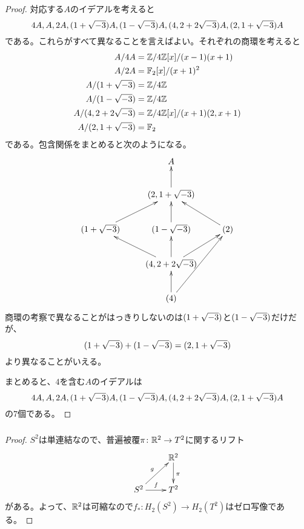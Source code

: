 \begin{proof}
対応する$A$のイデアルを考えると
\[
4A , A , 2A , (1+\sqrt{-3}) A , (1 - \sqrt{-3})A , (4, 2 + 2\sqrt{-3})A , (2 , 1 + \sqrt{-3})A
\]
である。これらがすべて異なることを言えばよい。それぞれの商環を考えると
\begin{align*}
  A/4A &= {\mathbb Z} / 4{\mathbb Z} [x] /(x-1)(x+1) \\
  A/2A &= {\mathbb F}_2[x]/(x+1)^2 \\
  A/(1 + \sqrt{-3}) &= \mathbb{Z} / 4 \mathbb{Z} \\
  A/(1 - \sqrt{-3}) &= \mathbb{Z} / 4 \mathbb{Z} \\
  A/(4, 2 + 2\sqrt{-3}) &= \mathbb{Z} / 4 \mathbb{Z} [x] / (x+1)(2,x+1) \\
  A/(2, 1+\sqrt{-3}) &= {\mathbb F}_2
\end{align*}
である。包含関係をまとめると次のようになる。
\[
\xymatrix{
{} & A & { } \\
{} & (2, 1+\s{-3}) \ar[u] & {} \\
(1+\s{-3}) \ar[ur] & (1-\s{-3}) \ar[u] & (2) \ar[lu] \\
{} & (4,2+2\s{-3}) \ar[u] \ar[lu] \ar[ru] & { } \\
{} & (4) \ar[u] \ar[uur] & { }
}
\]
商環の考察で異なることがはっきりしないのは$(1+\sqrt{-3})$と$(1-\sqrt{-3})$だけだが、
\[
(1+\sqrt{-3}) + (1-\sqrt{-3}) = (2, 1 + \sqrt{-3})
\]
より異なることがいえる。

まとめると、$4$を含む$A$のイデアルは
\[
4A , A , 2A , (1+\sqrt{-3}) A , (1 - \sqrt{-3})A , (4, 2 + 2\sqrt{-3})A , (2 , 1 + \sqrt{-3})A
\]
の$7$個である。
\end{proof}

\newpage

\subsubsection{}%
\begin{proof}
  $S^2$は単連結なので、普遍被覆$\pi \colon {\mathbb R}^2 \to T^2$に関するリフト
  \[
  \xymatrix{
  {} & \R^2 \ar[d]^{\pi} \\
  S^2 \ar[ur]^g \ar[r]^f & T^2
  }
  \]
  がある。よって、${\mathbb R}^2$は可縮なので$f_* \colon H_2(S^2 ) \to H_2(T^2)$はゼロ写像である。
\end{proof}

\newpage


